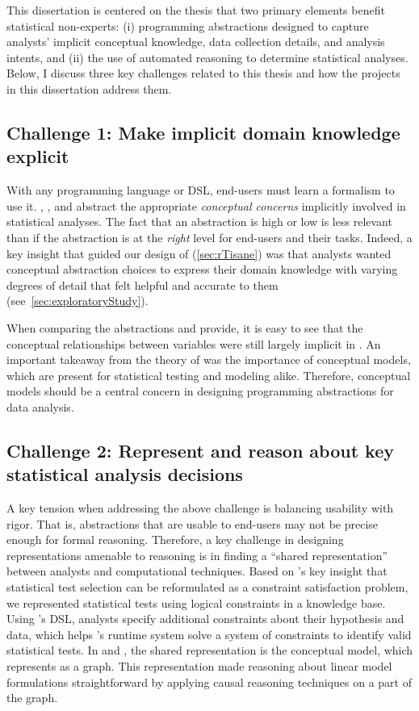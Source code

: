 This dissertation is centered on the thesis that two primary elements benefit
statistical non-experts: (i) programming abstractions designed to capture
analysts' implicit conceptual knowledge, data collection details, and analysis
intents, and (ii) the use of automated reasoning to determine statistical
analyses. Below, I discuss three key challenges related to this thesis and
how the projects in this dissertation address them.

\subsection{Challenge 1: Make implicit domain knowledge explicit} 
With any programming language or DSL, end-users must learn a formalism to use
it. \tea, \tisane, and \rTisane abstract the appropriate \textit{conceptual
concerns} implicitly involved in statistical analyses. The fact that an
abstraction is high or low is less relevant than if the abstraction is at the
\textit{right} level for end-users and their tasks. Indeed, a key insight that
guided our design of \rTisane (\autoref{sec:rTisane}) was that analysts wanted
conceptual abstraction choices to express their domain knowledge
with varying degrees of detail that felt helpful and accurate to them
(see~\autoref{sec:exploratoryStudy}). %

When comparing the abstractions \tea and \tisane provide, it is easy to see that
the conceptual relationships between variables were still largely implicit in
\tea. An important takeaway from the theory of \hypoForm was the importance of
conceptual models, which are present for statistical testing and modeling alike.
Therefore, conceptual models should be a central concern in designing
programming abstractions for data analysis. 

\subsection{Challenge 2: Represent and reason about key statistical analysis decisions}
A key tension when addressing the above challenge is balancing usability with
rigor. That is, abstractions that are usable to end-users may not be precise
enough for formal reasoning. Therefore, a key challenge in designing
representations amenable to reasoning is in finding a ``shared
representation''~\cite{heer2019agency} between analysts and computational
techniques. Based on \tea's key insight that statistical test selection can be
reformulated as a constraint satisfaction problem, we represented statistical
tests using logical constraints in a knowledge base. Using \tea's DSL, analysts
specify additional constraints about their hypothesis and data, which helps
\tea's runtime system solve a system of constraints to identify valid
statistical tests. In \tisane and \rTisane, the shared representation is the
conceptual model, which \tisane represents as a graph. This representation made
reasoning about linear model formulations straightforward by applying causal
reasoning techniques on a part of the graph. 

